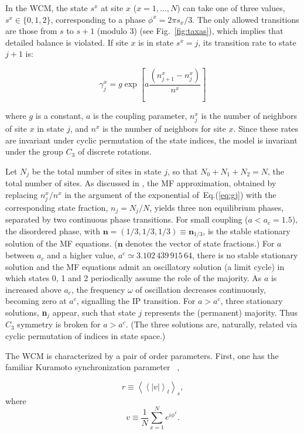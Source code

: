 In the WCM, the state $s^x$ at site $x$ ($x=1,\ldots,N$) can take one of three values, $s^x \in \{0,1,2\}$, corresponding to a phase
$\phi^x = 2 \pi s_x/3$.  The only allowed transitions are those from $s$ to $s+1$ (modulo 3) (see Fig.~\ref{fig:taxas}), which implies
that detailed balance is violated. If site $x$ is in state $s^x=j$, its transition rate to state $j+1$ is:

\begin{equation}
\label{eq:gj}
\gamma^x_j = g \exp \left[ a\frac {\left( n^x_{j+1} - n^x_j \right)} {n^x} \right]
\end{equation}

\noindent where $g$ is a constant, $a$ is the coupling parameter, $n^x_j$ is the number of neighbors of site $x$ in state $j$, and
$n^x$ is the number of neighbors for site $x$. Since these rates are invariant under cyclic permutation of the state indices, the model
is invariant under the group $C_3$ of discrete rotations.

Let $N_j$ be the total number of sites in state $j$, so that $N_0 +N_1 +N_2 = N$, the total number of sites. As discussed in
\cite{assis2011infinite}, the MF approximation, obtained by replacing $n^x_j/n^x$ in the argument of the exponential
of~Eq.(\ref{eq:gj}) with the corresponding state fraction, $n_j = N_j/N$, yields three non equilibrium phases, separated by two
continuous phase transitions. For small coupling ($a < a_c = 1.5$), the disordered phase, with $\textbf{n}=(1/3,1/3,1/3) \equiv
\textbf{n}_{1/3}$, is the stable stationary solution of the MF equations. ($\textbf{n}$ denotes the vector of state fractions.) For $a$
between $a_c$ and a higher value, $a^c\simeq 3.102\, 439\, 915\, 64$, there is no stable stationary solution and the MF equations admit
an oscillatory solution (a limit cycle) in which states 0, 1 and 2 periodically assume the role of the majority. As $a$ is increased
above $a_c$, the frequency $\omega$ of oscillation decreases continuously, becoming zero at $a^c$, signalling the IP transition.  For
$a> a^c$, three stationary solutions, \textbf{n}$_j$ appear, such that state $j$ represents the (permanent) majority. Thus $C_3$
symmetry is broken for $a > a^c$. (The three solutions are, naturally, related via cyclic permutation of indices in state space.) 

The WCM is characterized by a pair of order parameters. First, one has the familiar Kuramoto synchronization parameter
~\cite{Kuramoto84,Strogatz00,Wood06a},

\begin{equation}
    r \equiv \left<\left< |v| \right>_t\right>_s,
    \label{eq:r}
\end{equation}
\noindent where
\begin{equation}
    v \equiv \frac{1}{N} \sum^{N}_{x=1} e^{i\phi^x}.
    \label{eq:v}
\end{equation} 

